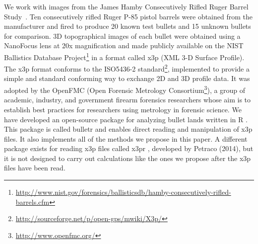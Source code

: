 \documentclass[aoas, preprint]{imsart}\usepackage[]{graphicx}\usepackage[]{color}
\newcommand{\hh}[1]{{\color{magenta} #1}}
\begin{document}

We work with images from the James Hamby Consecutively Rifled Ruger Barrel Study~\citep{hamby:2009}. Ten consecutively rifled Ruger P-85 pistol barrels were obtained from the manufacturer and fired to produce 20 known test bullets and 15 unknown bullets for comparison. 
3D topographical images of each bullet were obtained using a NanoFocus lens at 20x magnification and made publicly available on the NIST Ballistics Database Project\footnote{\url{http://www.nist.gov/forensics/ballisticsdb/hamby-consecutively-rifled-barrels.cfm}} in a format called x3p (XML 3-D Surface Profile). The x3p format conforms to the ISO5436-2 standard\footnote{\url{http://sourceforge.net/p/open-gps/mwiki/X3p/}}, implemented to provide a simple and standard conforming way to exchange 2D and 3D profile data. It was adopted by the OpenFMC (Open Forensic Metrology Consortium\footnote{\url{http://www.openfmc.org/}}), a group of academic, industry, and government firearm forensics researchers whose aim is to establish best practices for researchers using metrology in forensic science. We have developed an open-source package for analyzing bullet lands written in R \citep{R}. This package is called bulletr \citep{bulletr} and enables direct reading and manipulation of x3p files. It also implements all of the methods we propose in this paper. A different package exists for reading x3p files called x3pr \citep{x3pr}, developed by Petraco (2014), but it is not designed to carry out calculations like the ones we propose after the x3p files have been read.
\end{document}
